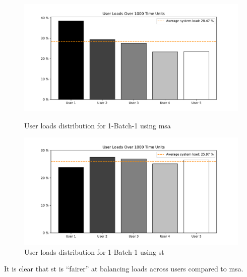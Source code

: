 \documentclass{seal_thesis}
\begin{document}
\begin{figure}[!ht]
	\centering
	\begin{minipage}[b]{0.45\textwidth}
		\includegraphics[width=\textwidth]{img/1_BATCHONE_MSA_NU5_GI3_SIM1000_FAIR}
		\caption{User loads distribution for 1-Batch-1 using \gls{msa}}
		\label{fig:msa_fairness}
	\end{minipage}
	\hfill
	\begin{minipage}[b]{0.45\textwidth}
		\includegraphics[width=\textwidth]{img/1_BATCHONE_ST_NU5_GI3_SIM1000_FAIR}
		\caption{User loads distribution for 1-Batch-1 using \gls{st}}
		\label{fig:st_fairness}
	\end{minipage}
\end{figure}

It is clear that \gls{st} is ``fairer'' at balancing loads across users compared to \gls{msa}. 

\subsection{}
\end{document}
